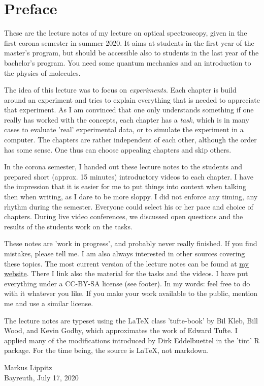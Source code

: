 \renewcommand{\lastmod}{\ \ }
\renewcommand{\chapterauthors}{\ \ }

\chapter*{Preface}


These are the lecture notes of my lecture on optical spectroscopy, given in the first corona semester in summer 2020. It aims at students in the first year of the master's program, but should be accessible also to students in the last year of the bachelor's program. You need some quantum mechanics and an introduction to the physics of molecules.

The idea of this lecture was to focus on \emph{experiments}. Each chapter is build around an experiment and tries to explain everything that is needed to appreciate that experiment. As I am convinced that one only understands something if one really has worked with the concepts, each chapter has a \emph{task}, which is in many cases to evaluate 'real' experimental data, or to simulate the experiment in a computer. The chapters are rather independent of each other, although the order has some sense. One thus can choose appealing chapters and skip others.

In the corona semester, I handed out these lecture notes to the students and prepared short (approx. 15 minutes) introductory videos to each chapter. I have the impression that it is easier for me to put things into context when talking then when writing, as I dare to be more sloppy. I did not enforce any timing, any rhythm during the semester. Everyone could select his or her pace and choice of chapters. During live video conferences, we discussed open questions and the results of the students work on the tasks.

These notes are 'work in progress', and probably never really finished. If you find mistakes, please tell me. I am also always interested in other sources covering these topics.
The most current version of the lecture notes can be found at 
\href{http://www.ep3.uni-bayreuth.de/lecturenotes}{my website}. There I link also the material for the tasks and the videos. I have put everything under a CC-BY-SA license (see footer). In my words: feel free to do with it whatever you like. If you make your work available to the public, mention me and use a similar license. 


The lecture notes are typeset using the LaTeX class 'tufte-book' by Bil Kleb, Bill Wood, and Kevin Godby, which  approximates the work of Edward Tufte. I applied many of the modifications introduced by Dirk Eddelbuettel in the 'tint' R package. For the time being, the source is LaTeX, not markdown.

\vspace{2\baselineskip}

Markus Lippitz \\ Bayreuth, July 17, 2020

